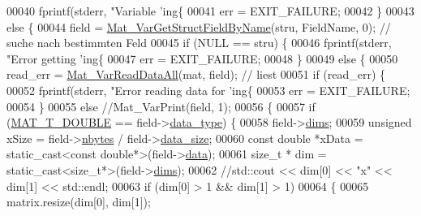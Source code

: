 \begin{DoxyCode}
{00040         fprintf(stderr, \textcolor{stringliteral}{"Variable 'ing\{%
00041         err = EXIT\_FAILURE;
00042     \}
00043     \textcolor{keywordflow}{else} \{
00044         field = \hyperlink{group___m_a_t_ga619d241b49ce97334a38add60562c7be}{Mat\_VarGetStructFieldByName}(stru, FieldName, 0); \textcolor{comment}{// suche nach
       bestimmten Feld}
00045         \textcolor{keywordflow}{if} (NULL == stru) \{
00046             fprintf(stderr, \textcolor{stringliteral}{"Error getting 'ing\{%
00047             err = EXIT\_FAILURE;
00048         \}
00049         \textcolor{keywordflow}{else} \{
00050             read\_err = \hyperlink{group___m_a_t_gaa8060d7c8e5da0aa9ee5f96e5f1eb30a}{Mat\_VarReadDataAll}(mat, field); \textcolor{comment}{// liest}
00051             \textcolor{keywordflow}{if} (read\_err) \{
00052                 fprintf(stderr, \textcolor{stringliteral}{"Error reading data for 'ing\{%
00053                 err = EXIT\_FAILURE;
00054             \}
00055             \textcolor{keywordflow}{else} \textcolor{comment}{//Mat\_VarPrint(field, 1);}
00056             \{
00057                 \textcolor{keywordflow}{if} (\hyperlink{group___m_a_t_ggacf7b3b879282b7ab3a51190e49bf3453a31e721ecf7e188196f83c32838288797}{MAT\_T\_DOUBLE} == field->\hyperlink{group___m_a_t_ab6aafe9bd77f0f077852593dec438144}{data\_type}) \{
00058                     field->\hyperlink{group___m_a_t_a8e01234e1c862ce3472bb37f5a09b92c}{dims};
00059                     \textcolor{keywordtype}{unsigned} xSize = field->\hyperlink{group___m_a_t_abf1c844540503be2df9bb3db93cfe307}{nbytes} / field->\hyperlink{group___m_a_t_a9ad1c82e2b568da617e12dc73a26e1f9}{data\_size};
00060                     \textcolor{keyword}{const} \textcolor{keywordtype}{double} *xData = \textcolor{keyword}{static\_cast<}\textcolor{keyword}{const }\textcolor{keywordtype}{double}*\textcolor{keyword}{>}(field->\hyperlink{group___m_a_t_a5672978efa230bbdecdf38ede781f7fa}{data});
00061                     \textcolor{keywordtype}{size\_t} * dim = \textcolor{keyword}{static\_cast<}\textcolor{keywordtype}{size\_t}*\textcolor{keyword}{>}(field->\hyperlink{group___m_a_t_a8e01234e1c862ce3472bb37f5a09b92c}{dims});
00062                     \textcolor{comment}{//std::cout << dim[0] << "x" << dim[1] << std::endl;}
00063                     \textcolor{keywordflow}{if} (dim[0] > 1 && dim[1] > 1)
00064                     \{
00065                         matrix.resize(dim[0], dim[1]);
}}}}
\end{DoxyCode}
